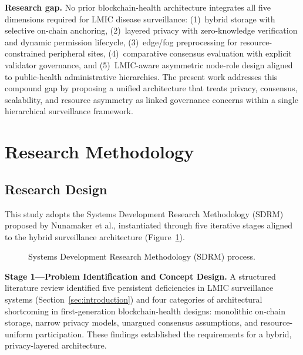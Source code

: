 \documentclass[AMA,LATO1COL]{WileyNJD-v2}
\begin{document}
\textbf{Research gap.} No prior blockchain-health architecture integrates all five dimensions required for LMIC disease surveillance: (1)~hybrid storage with selective on-chain anchoring, (2)~layered privacy with zero-knowledge verification and dynamic permission lifecycle, (3)~edge/fog preprocessing for resource-constrained peripheral sites, (4)~comparative consensus evaluation with explicit validator governance, and (5)~LMIC-aware asymmetric node-role design aligned to public-health administrative hierarchies. The present work addresses this compound gap by proposing a unified architecture that treats privacy, consensus, scalability, and resource asymmetry as linked governance concerns within a single hierarchical surveillance framework.

\section{Research Methodology}\label{sec:methodology}

\subsection{Research Design}\label{subsec:design}

This study adopts the Systems Development Research Methodology (SDRM) proposed by Nunamaker et al.\cite{nunamaker1990systems}, instantiated through five iterative stages aligned to the hybrid surveillance architecture (Figure~\ref{fig:sdrm}).

\begin{figure}[!ht]
\centering
{}
\caption{Systems Development Research Methodology (SDRM) process.}\label{fig:sdrm}
\end{figure}

\textbf{Stage 1---Problem Identification and Concept Design.} A structured literature review identified five persistent deficiencies in LMIC surveillance systems (Section~\ref{sec:introduction}) and four categories of architectural shortcoming in first-generation blockchain-health designs: monolithic on-chain storage, narrow privacy models, unargued consensus assumptions, and resource-uniform participation. These findings established the requirements for a hybrid, privacy-layered architecture.
\end{document}
